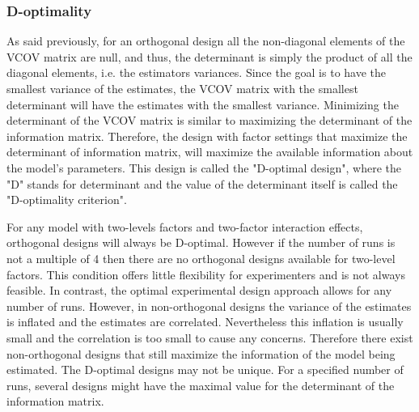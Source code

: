 \subsubsection{D-optimality}
As said previously, for an orthogonal design all the non-diagonal elements of the VCOV matrix are null,
and thus, the determinant is simply the product of all the diagonal elements, i.e. the estimators variances.
Since the goal is to have the smallest variance of the estimates, the VCOV matrix with the smallest determinant will have the 
estimates with the smallest variance. 
Minimizing the determinant of the VCOV matrix is similar to maximizing the determinant of the information matrix. 
Therefore, the design with factor settings that maximize the determinant of information matrix, 
will maximize the available information about the model's parameters. 
This design is called the "D-optimal design", 
where the "D" stands for determinant and the value of the determinant itself is called the "D-optimality criterion".

For any model with two-levels factors and two-factor interaction effects, orthogonal designs will always be D-optimal. 
However if the number of runs is not a multiple of 4 then there are no orthogonal designs available for two-level factors. 
This condition offers little flexibility for experimenters and is not always feasible. 
In contrast, the optimal experimental design approach allows for any number of runs. 
However, in non-orthogonal designs the variance of the estimates is inflated and the estimates are correlated. 
Nevertheless this inflation is usually small and the correlation is too small to cause any concerns.
Therefore there exist non-orthogonal designs that still maximize the information of the model being estimated.
The D-optimal designs may not be unique. For a specified number of runs,
 several designs might have the maximal value for the determinant of the information matrix.\\



